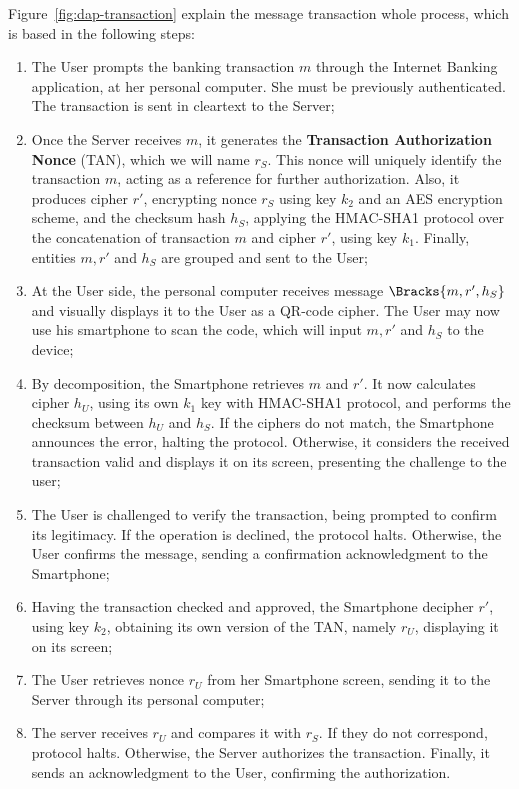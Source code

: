 Figure~\ref{fig:dap-transaction} explain the message transaction whole process, which is based in the following steps:

\begin{enumerate}
  \item The User prompts the banking transaction \(m\) through the Internet Banking application, at her personal computer. She must be previously authenticated. The transaction is sent in cleartext to the Server;

  \item Once the Server receives \(m\), it generates the \textbf{Transaction Authorization Nonce} (TAN), which we will name $r_S$. This nonce will uniquely identify the transaction \(m\), acting as a reference for further authorization. Also, it produces cipher $r'$, encrypting nonce $r_S$ using key $k_2$ and an AES encryption scheme, and the checksum hash $h_S$, applying the HMAC-SHA1 protocol over the concatenation of transaction \(m\) and cipher $r'$, using key $k_1$. Finally, entities $m, r'$ and $h_S$ are grouped and sent to the User;

  \item At the User side, the personal computer receives message $\Bracks{m, r', h_S}$ and visually displays it to the User as a QR-code cipher. The User may now use his smartphone to scan the code, which will input $m, r'$ and $h_S$ to the device;

  \item By decomposition, the Smartphone retrieves \(m\) and $r'$. It now calculates cipher $h_U$, using its own $k_1$ key with HMAC-SHA1 protocol, and performs the checksum between $h_U$ and $h_S$. If the ciphers do not match, the Smartphone announces the error, halting the protocol. Otherwise, it considers the received transaction valid and displays it on its screen, presenting the challenge to the user;

  \item The User is challenged to verify the transaction, being prompted to confirm its legitimacy. If the operation is declined, the protocol halts. Otherwise, the User confirms the message, sending a confirmation acknowledgment to the Smartphone;

  \item Having the transaction checked and approved, the Smartphone decipher $r'$, using key $k_2$, obtaining its own version of the TAN, namely $r_U$, displaying it on its screen;

  \item The User retrieves nonce $r_U$ from her Smartphone screen, sending it to the Server through its personal computer;

  \item The server receives $r_U$ and compares it with $r_S$. If they do not correspond, protocol halts. Otherwise, the Server authorizes the transaction. Finally, it sends an acknowledgment to the User, confirming the authorization.
\end{enumerate}

